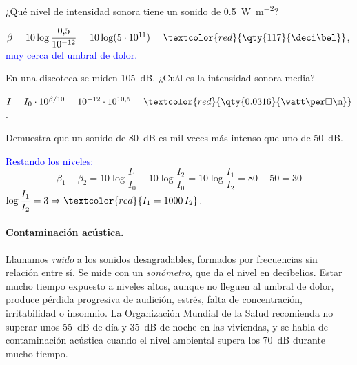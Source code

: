 \begin{exercise}
    ¿Qué nivel de intensidad sonora tiene un sonido de \qty{0.5}{\watt\per\square\m}?
    \begin{solu}
        \(\beta = 10\log\dfrac{0{,}5}{10^{-12}} = 10\log(5\cdot 10^{11}) = \textcolor{red}{\qty{117}{\deci\bel}}\),
        \textcolor{blue}{muy cerca del umbral de dolor.}
    \end{solu}
\end{exercise}

\begin{exercise}
    En una discoteca se miden \qty{105}{\deci\bel}. ¿Cuál es la intensidad sonora media?
    \begin{solu}
        \(I = I_0\cdot 10^{\beta/10} = 10^{-12}\cdot 10^{10{,}5} = \textcolor{red}{\qty{0.0316}{\watt\per\square\m}}\).
    \end{solu}
\end{exercise}

\begin{exercise}
    Demuestra que un sonido de \qty{80}{\deci\bel} es mil veces más intenso que uno de \qty{50}{\deci\bel}.
    \begin{solu}
        \textcolor{blue}{Restando los niveles:}
        \[ \beta_1 - \beta_2 = 10\log\dfrac{I_1}{I_0} - 10\log\dfrac{I_2}{I_0} = 10\log\dfrac{I_1}{I_2} = 80 - 50 = 30 \]
        \(\log\dfrac{I_1}{I_2} = 3 \Rightarrow \textcolor{red}{I_1 = 1000\,I_2}\).
    \end{solu}
\end{exercise}

\paragraph{Contaminación acústica.} Llamamos \emph{ruido} a los sonidos desagradables, formados por frecuencias sin relación
entre sí. Se mide con un \emph{sonómetro}, que da el nivel en decibelios. Estar mucho tiempo expuesto a niveles altos,
aunque no lleguen al umbral de dolor, produce pérdida progresiva de audición, estrés, falta de concentración, irritabilidad o
insomnio. La Organización Mundial de la Salud recomienda no superar unos \qty{55}{\deci\bel} de día y \qty{35}{\deci\bel} de
noche en las viviendas, y se habla de contaminación acústica cuando el nivel ambiental supera los \qty{70}{\deci\bel} durante
mucho tiempo.

